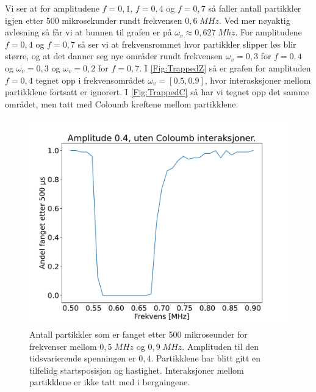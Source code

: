 \documentclass[reprint,english,notitlepage, nofootinbib]{revtex4-1}  %
\begin{document}
Vi ser at for amplitudene $f = 0,1$, $f = 0,4$ og $f=0,7$ så faller antall partikkler igjen etter 500 mikrosekunder rundt frekvensen $0,6 \; MHz$. Ved mer nøyaktig avlesning så får vi at bunnen til grafen er på $\omega_v \approx 0,627 \; Mhz$. For amplitudene $f=0,4$ og $f=0,7$ så ser vi at frekvensrommet hvor partikkler slipper løs blir større, og at det danner seg nye områder rundt frekvensen $\omega_v = 0,3$ for $f=0,4$ og $\omega_v = 0,3$ og $\omega_v=0,2$ for $f=0,7$. I \autoref{Fig:TrappedZ} så er grafen for amplituden $f = 0,4$ tegnet opp i frekvensområdet $\omega_v = [0.5, 0.9]$, hvor interasksjoner mellom partikklene fortsatt er ignorert. I \autoref{Fig:TrappedC} så har vi tegnet opp det samme området, men tatt med Coloumb kreftene mellom partikklene. 

\begin{figure}[H]
\centering
\includegraphics[scale=0.3]{../Images/TrappedZoomed.pdf}
\caption{Antall partikkler som er fanget etter 500 mikroseunder for frekvenser mellom $0,5 \; MHz$ og $0,9 \; MHz$. Amplituden til den tidsvarierende spenningen er $0,4$. Partikklene har blitt gitt en tilfelidg startsposisjon og hastighet. Interaksjoner mellom partikklene er ikke tatt med i bergningene.}
\label{Fig:TrappedZ}
\end{figure}
\end{document}
